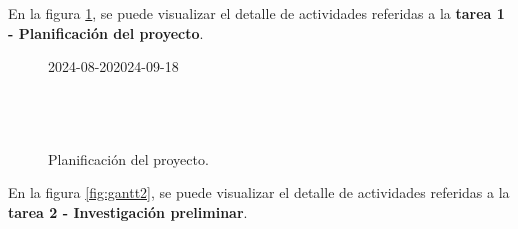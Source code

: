 En la figura \ref{fig:gantt1}, se puede visualizar el detalle de actividades
referidas a la \textbf{tarea 1 - Planificación del proyecto}.

\begin{figure}[H]
	\begin{ganttchart}[
			time slot unit=day,
			time slot format=isodate,
			x unit=0.35cm, %
			y unit title=0.7cm, %
			y unit chart=0.7cm, %
			milestone/.append style={xscale=4},
			vgrid,
			hgrid,
		]{2024-08-20}{2024-09-18}
		 \\
		 \\
		 \\
		 \\
	\end{ganttchart}
	\caption{Planificación del proyecto.}

	\label{fig:gantt1}
\end{figure}

En la figura \ref{fig:gantt2}, se puede visualizar el detalle de actividades
referidas a la \textbf{tarea 2 - Investigación preliminar}.

